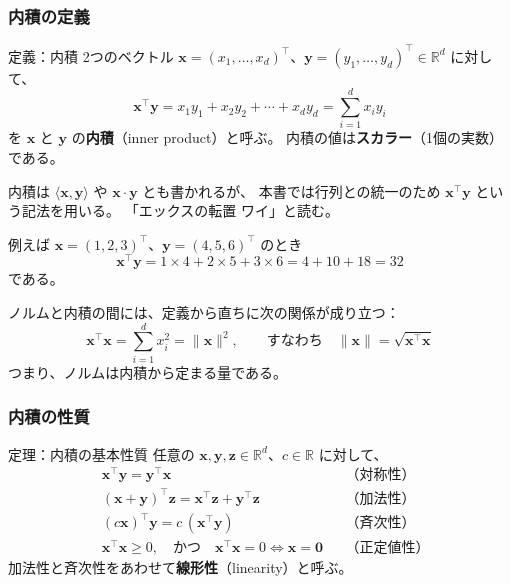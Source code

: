 \subsubsection{内積の定義}

\begin{itembox}[l]{定義：内積}
2つのベクトル $\bm{x} = (x_1, \ldots, x_d)^\top$、$\bm{y} = (y_1, \ldots, y_d)^\top \in \mathbb{R}^d$
に対して、
\begin{equation}
  \bm{x}^\top \bm{y} = x_1 y_1 + x_2 y_2 + \cdots + x_d y_d = \sum_{i=1}^{d} x_i y_i
\end{equation}
を $\bm{x}$ と $\bm{y}$ の\textbf{内積}（inner product）と呼ぶ。
内積の値は\textbf{スカラー}（1個の実数）である。
\end{itembox}

内積は $\langle \bm{x}, \bm{y} \rangle$ や $\bm{x} \cdot \bm{y}$ とも書かれるが、
本書では行列との統一のため $\bm{x}^\top \bm{y}$ という記法を用いる。
「エックスの転置 ワイ」と読む。

例えば $\bm{x} = (1, 2, 3)^\top$、$\bm{y} = (4, 5, 6)^\top$ のとき
\begin{equation*}
  \bm{x}^\top \bm{y} = 1 \times 4 + 2 \times 5 + 3 \times 6 = 4 + 10 + 18 = 32
\end{equation*}
である。

ノルムと内積の間には、定義から直ちに次の関係が成り立つ：
\begin{equation}
  \bm{x}^\top \bm{x} = \sum_{i=1}^{d} x_i^2 = \|\bm{x}\|^2,
  \qquad \text{すなわち} \quad \|\bm{x}\| = \sqrt{\bm{x}^\top \bm{x}}
\end{equation}
つまり、ノルムは内積から定まる量である。

\subsubsection{内積の性質}

\begin{itembox}[l]{定理：内積の基本性質}
任意の $\bm{x}, \bm{y}, \bm{z} \in \mathbb{R}^d$、$c \in \mathbb{R}$ に対して、
\begin{align}
  &\bm{x}^\top \bm{y} = \bm{y}^\top \bm{x} &&\text{（対称性）} \\
  &(\bm{x} + \bm{y})^\top \bm{z} = \bm{x}^\top \bm{z} + \bm{y}^\top \bm{z} &&\text{（加法性）} \\
  &(c\bm{x})^\top \bm{y} = c\, (\bm{x}^\top \bm{y}) &&\text{（斉次性）} \\
  &\bm{x}^\top \bm{x} \geq 0, \quad \text{かつ} \quad \bm{x}^\top \bm{x} = 0 \iff \bm{x} = \bm{0}
    &&\text{（正定値性）}
\end{align}
加法性と斉次性をあわせて\textbf{線形性}（linearity）と呼ぶ。
\end{itembox}

